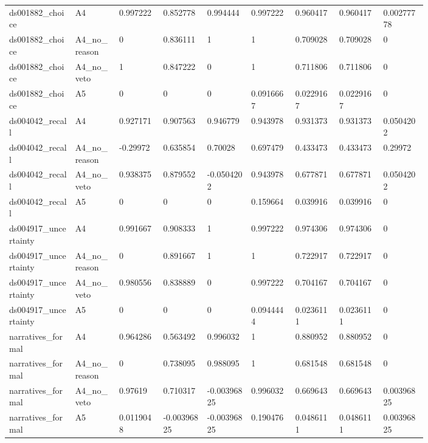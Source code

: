 \documentclass[11pt]{article}
\begin{document}
\begin{landscape}
\begin{longtable}{@{}L{0.120\linewidth}L{0.085\linewidth}L{0.085\linewidth}L{0.085\linewidth}L{0.085\linewidth}L{0.085\linewidth}L{0.085\linewidth}L{0.085\linewidth}L{0.085\linewidth}@{}}
ds001882\_choice & A4 & 0.997222 & 0.852778 & 0.994444 & 0.997222 & 0.960417 & 0.960417 & 0.00277778 \\
ds001882\_choice & A4\_no\_reason & 0 & 0.836111 & 1 & 1 & 0.709028 & 0.709028 & 0 \\
ds001882\_choice & A4\_no\_veto & 1 & 0.847222 & 0 & 1 & 0.711806 & 0.711806 & 0 \\
ds001882\_choice & A5 & 0 & 0 & 0 & 0.0916667 & 0.0229167 & 0.0229167 & 0 \\
ds004042\_recall & A4 & 0.927171 & 0.907563 & 0.946779 & 0.943978 & 0.931373 & 0.931373 & 0.0504202 \\
ds004042\_recall & A4\_no\_reason & -0.29972 & 0.635854 & 0.70028 & 0.697479 & 0.433473 & 0.433473 & 0.29972 \\
ds004042\_recall & A4\_no\_veto & 0.938375 & 0.879552 & -0.0504202 & 0.943978 & 0.677871 & 0.677871 & 0.0504202 \\
ds004042\_recall & A5 & 0 & 0 & 0 & 0.159664 & 0.039916 & 0.039916 & 0 \\
ds004917\_uncertainty & A4 & 0.991667 & 0.908333 & 1 & 0.997222 & 0.974306 & 0.974306 & 0 \\
ds004917\_uncertainty & A4\_no\_reason & 0 & 0.891667 & 1 & 1 & 0.722917 & 0.722917 & 0 \\
ds004917\_uncertainty & A4\_no\_veto & 0.980556 & 0.838889 & 0 & 0.997222 & 0.704167 & 0.704167 & 0 \\
ds004917\_uncertainty & A5 & 0 & 0 & 0 & 0.0944444 & 0.0236111 & 0.0236111 & 0 \\
narratives\_formal & A4 & 0.964286 & 0.563492 & 0.996032 & 1 & 0.880952 & 0.880952 & 0 \\
narratives\_formal & A4\_no\_reason & 0 & 0.738095 & 0.988095 & 1 & 0.681548 & 0.681548 & 0 \\
narratives\_formal & A4\_no\_veto & 0.97619 & 0.710317 & -0.00396825 & 0.996032 & 0.669643 & 0.669643 & 0.00396825 \\
narratives\_formal & A5 & 0.0119048 & -0.00396825 & -0.00396825 & 0.190476 & 0.0486111 & 0.0486111 & 0.00396825 \\
\end{longtable}
\normalsize
\end{landscape}
\end{document}
